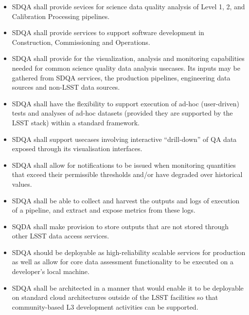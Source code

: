 \begin{itemize}
\item SDQA shall provide sevices for science data quality analysis of Level 1, 2, and Calibration Processing pipelines.

\item SDQA shall provide services to support software development in Construction, Commissioning and Operations.

\item SDQA shall provide for the visualization, analysis and monitoring capabilities needed for common science quality data analysis usecases. Its inputs may be gathered from SDQA services, the production pipelines, engineering data sources and non-LSST data sources.

\item SDQA shall have the flexibility to support execution of ad-hoc (user-driven) tests and analyses of ad-hoc datasets (provided they are supported by the LSST stack) within a standard framework.

\item SDQA shall support usecases involving interactive ``drill-down'' of QA data exposed through its visualisation interfaces.

\item SDQA shall allow for notifications to be issued when monitoring quantities that exceed their permissible thresholds and/or have degraded over historical values.

\item SDQA shall be able to collect and harvest the outputs and logs of execution of a pipeline, and extract and expose metrics from these logs. 

\item SQDA shall make provision to store outputs that are not stored through other LSST data access services.

\item SDQA should be deployable as high-reliability scalable services for production as well as allow for core data assessment functionality to be executed on a developer's local machine.

\item SDQA shall be architected in a manner that would enable it to be deployable on standard cloud architectures outside of the LSST facilities so that community-based L3 development activities can be supported. 

\end{itemize}

